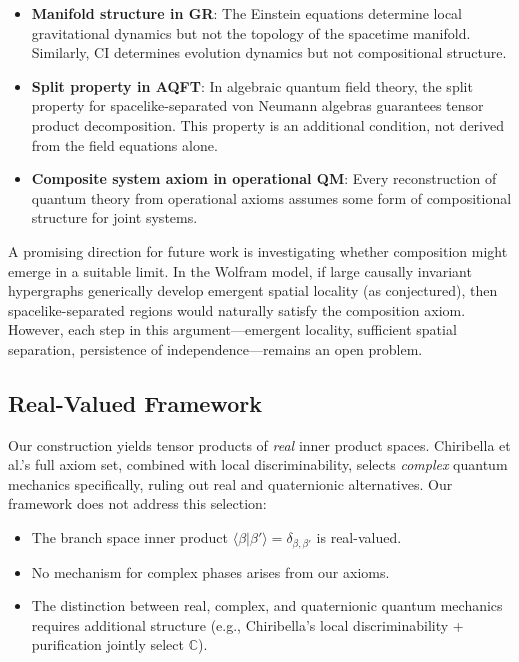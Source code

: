 \documentclass[11pt,a4paper]{article}
\theoremstyle{definition}
\theoremstyle{remark}
\newcommand{\braket}[2]{\langle#1|#2\rangle}
\begin{document}
\begin{itemize}
\item \textbf{Manifold structure in GR}: The Einstein equations determine
  local gravitational dynamics but not the topology of the spacetime
  manifold. Similarly, CI determines evolution dynamics but not
  compositional structure.
\item \textbf{Split property in AQFT}: In algebraic quantum field theory,
  the split property for spacelike-separated von Neumann algebras
  guarantees tensor product decomposition. This property is an additional
  condition, not derived from the field equations alone.
\item \textbf{Composite system axiom in operational QM}: Every
  reconstruction of quantum theory from operational axioms
  \cite{hardy2001quantum,chiribella2011informational,masanes2011general}
  assumes some form of compositional structure for joint systems.
\end{itemize}

A promising direction for future work is investigating whether
composition might emerge in a suitable limit. In the Wolfram model, if
large causally invariant hypergraphs generically develop emergent spatial
locality (as conjectured), then spacelike-separated regions would
naturally satisfy the composition axiom. However, each step in this
argument---emergent locality, sufficient spatial separation,
persistence of independence---remains an open problem.

\subsection{Real-Valued Framework}

Our construction yields tensor products of \textit{real} inner product
spaces. Chiribella et al.'s full axiom set, combined with local
discriminability, selects \textit{complex} quantum mechanics
specifically, ruling out real and quaternionic alternatives. Our
framework does not address this selection:

\begin{itemize}
\item The branch space inner product
  $\braket{\beta}{\beta'} = \delta_{\beta,\beta'}$ is real-valued.
\item No mechanism for complex phases arises from our axioms.
\item The distinction between real, complex, and quaternionic quantum
  mechanics requires additional structure (e.g., Chiribella's local
  discriminability + purification jointly select $\mathbb{C}$).
\end{itemize}
\end{document}
